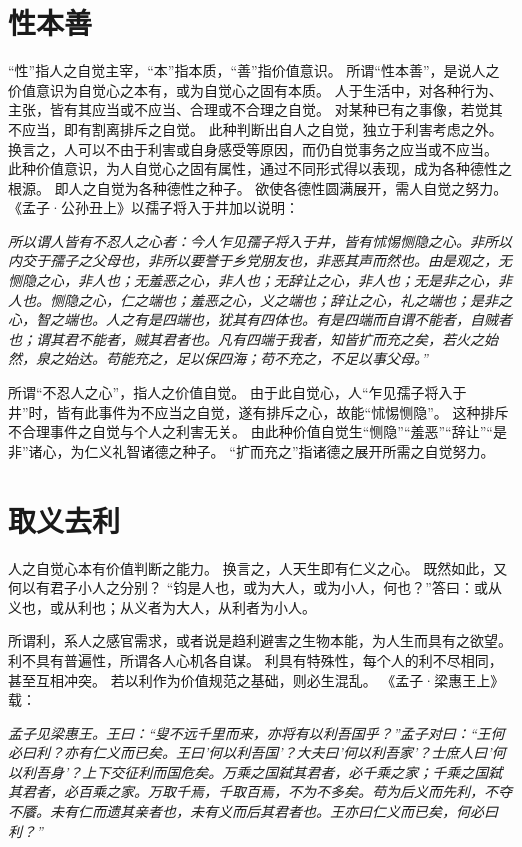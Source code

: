\documentclass[11pt]{article}
\begin{document}
\section{性本善}
“性”指人之自觉主宰，“本”指本质，“善”指价值意识。
所谓“性本善”，是说人之价值意识为自觉心之本有，或为自觉心之固有本质。
人于生活中，对各种行为、主张，皆有其应当或不应当、合理或不合理之自觉。
对某种已有之事像，若觉其不应当，即有割离排斥之自觉。
此种判断出自人之自觉，独立于利害考虑之外。
换言之，人可以不由于利害或自身感受等原因，而仍自觉事务之应当或不应当。
此种价值意识，为人自觉心之固有属性，通过不同形式得以表现，成为各种德性之根源。
即人之自觉为各种德性之种子。
欲使各德性圆满展开，需人自觉之努力。
《孟子·公孙丑上》以孺子将入于井加以说明：

\textit{所以谓人皆有不忍人之心者：今人乍见孺子将入于井，皆有怵惕恻隐之心。非所以内交于孺子之父母也，非所以要誉于乡党朋友也，非恶其声而然也。由是观之，无恻隐之心，非人也；无羞恶之心，非人也；无辞让之心，非人也；无是非之心，非人也。恻隐之心，仁之端也；羞恶之心，义之端也；辞让之心，礼之端也；是非之心，智之端也。人之有是四端也，犹其有四体也。有是四端而自谓不能者，自贼者也；谓其君不能者，贼其君者也。凡有四端于我者，知皆扩而充之矣，若火之始然，泉之始达。苟能充之，足以保四海；苟不充之，不足以事父母。”}

所谓“不忍人之心”，指人之价值自觉。
由于此自觉心，人“乍见孺子将入于井”时，皆有此事件为不应当之自觉，遂有排斥之心，故能“怵惕恻隐”。
这种排斥不合理事件之自觉与个人之利害无关。
由此种价值自觉生“恻隐”“羞恶”“辞让”“是非”诸心，为仁义礼智诸德之种子。
“扩而充之”指诸德之展开所需之自觉努力。

\section{取义去利}
人之自觉心本有价值判断之能力。
换言之，人天生即有仁义之心。
既然如此，又何以有君子小人之分别？
“钧是人也，或为大人，或为小人，何也？”答曰：或从义也，或从利也；从义者为大人，从利者为小人。

\newline

所谓利，系人之感官需求，或者说是趋利避害之生物本能，为人生而具有之欲望。
利不具有普遍性，所谓各人心机各自谋。
利具有特殊性，每个人的利不尽相同，甚至互相冲突。
若以利作为价值规范之基础，则必生混乱。
《孟子·梁惠王上》载：

\textit{孟子见梁惠王。王曰：“叟不远千里而来，亦将有以利吾国乎？”孟子对曰：“王何必曰利？亦有仁义而已矣。王曰’何以利吾国’？大夫曰’何以利吾家’？士庶人曰’何以利吾身’？上下交征利而国危矣。万乘之国弑其君者，必千乘之家；千乘之国弑其君者，必百乘之家。万取千焉，千取百焉，不为不多矣。苟为后义而先利，不夺不餍。未有仁而遗其亲者也，未有义而后其君者也。王亦曰仁义而已矣，何必曰利？”}
\end{document}
